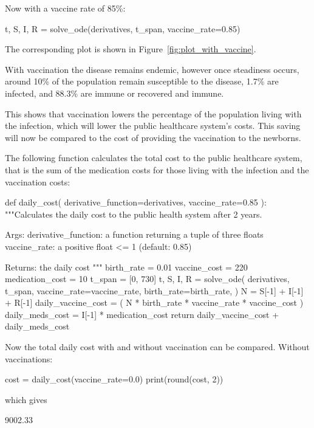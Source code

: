 Now with a vaccine rate of 85\%:

\begin{pyin}
t, S, I, R = solve_ode(derivatives, t_span, vaccine_rate=0.85)
\end{pyin}

The corresponding plot is shown in Figure~\ref{fig:plot_with_vaccine}.

With vaccination the disease remains endemic, however once steadiness occurs,
around 10\% of the population remain susceptible to the disease, 1.7\% are
infected, and 88.3\% are immune or recovered and immune.

This shows that vaccination lowers the percentage of the population living with
the infection, which will lower the public healthcare system's costs. This
saving will now be compared to the cost of providing the vaccination to the
newborns.

The following function calculates the total cost to the public healthcare
system, that is the sum of the medication costs for those living with the
infection and the vaccination costs:

\begin{pyin}
def daily_cost(
    derivative_function=derivatives, vaccine_rate=0.85
):
    """Calculates the daily cost to the public health system after
    2 years.

    Args:
        derivative_function: a function returning a tuple
                             of three floats
        vaccine_rate: a positive float <= 1 (default: 0.85)

    Returns:
        the daily cost
    """
    birth_rate = 0.01
    vaccine_cost = 220
    medication_cost = 10
    t_span = [0, 730]
    t, S, I, R = solve_ode(
        derivatives,
        t_span,
        vaccine_rate=vaccine_rate,
        birth_rate=birth_rate,
    )
    N = S[-1] + I[-1] + R[-1]
    daily_vaccine_cost = (
        N * birth_rate * vaccine_rate * vaccine_cost
    )
    daily_meds_cost = I[-1] * medication_cost
    return daily_vaccine_cost + daily_meds_cost
\end{pyin}

Now the total daily cost with and without vaccination can be compared.
Without vaccinations:

\begin{pyin}
cost = daily_cost(vaccine_rate=0.0)
print(round(cost, 2))
\end{pyin}

which gives

\begin{pyout}
9002.33
\end{pyout}

